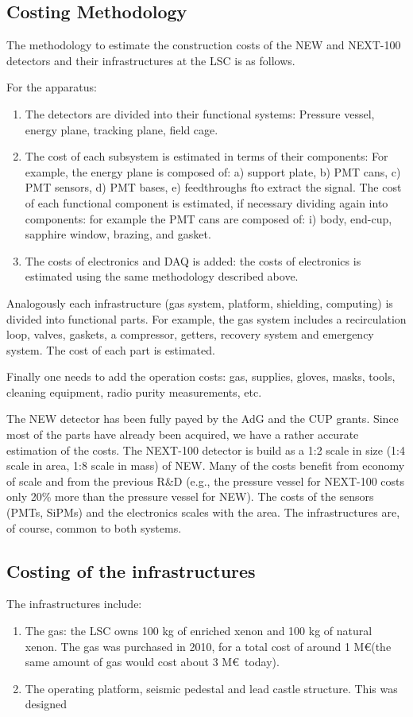 \subsection{Costing Methodology}
The methodology to estimate the construction costs of the NEW and NEXT-100 detectors and their infrastructures at the LSC is as follows.

For the apparatus:

\begin{enumerate}
\item The detectors are divided into their functional systems: Pressure vessel, energy plane, tracking plane, field cage.
\item The cost of each subsystem is estimated in terms of their components: For example, the energy plane is composed of: a) support plate, b) PMT cans, c) PMT sensors, d) PMT bases, e) feedthroughs fto extract the signal. The cost of each functional component is estimated, if necessary dividing again into components: for example the PMT cans are composed of: i) body, end-cup, sapphire window, brazing, and gasket.
\item The costs of electronics and DAQ is added: the costs of electronics is estimated using the same methodology described above. 
\end{enumerate}

Analogously each infrastructure (gas system, platform, shielding, computing) is divided into functional parts. For example, the gas system includes a recirculation loop, valves, gaskets, a compressor, getters, recovery system and emergency system. The cost of each part is estimated. 

Finally one needs to add the operation costs: gas, supplies, gloves, masks, tools, cleaning equipment, radio purity measurements, etc. 

The NEW detector has been fully payed by the AdG and the CUP grants. Since most of the parts have already been acquired, we have a rather accurate estimation of the costs. The NEXT-100 detector is build as a 1:2 scale in size (1:4 scale in area, 1:8 scale in mass) of NEW. Many of the costs benefit from economy of scale and from the previous R\&D (e.g., the pressure vessel for NEXT-100 costs only 20\% more than the pressure vessel for NEW). The costs of the sensors (PMTs, SiPMs) and the electronics scales with the area. The infrastructures are, of course, common to both systems.

\subsection{Costing of the infrastructures}
The infrastructures include:
\begin{enumerate}
\item The gas: the LSC owns 100 kg of enriched xenon and 100 kg of natural xenon. The gas was purchased in 2010, for a total cost of around 1 M\euro (the same amount of gas would cost about 3 M\euro\ today).
\item The operating platform, seismic pedestal and lead castle structure. This was designed 

\end{enumerate}


